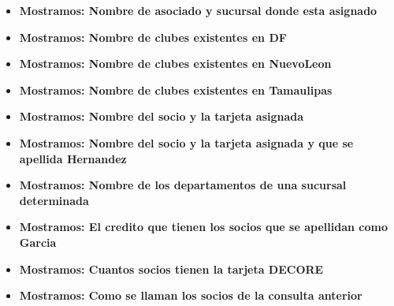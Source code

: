 \documentclass[12pt, fleqn]{article}                             %
\begin{document}
    \begin{itemize}

        \item
            \textbf{Mostramos: Nombre de asociado y sucursal donde esta asignado}
            

        \item
            \textbf{Mostramos: Nombre de clubes existentes en DF}
            

        \item
            \textbf{Mostramos: Nombre de clubes existentes en NuevoLeon}
            

        \item
            \textbf{Mostramos: Nombre de clubes existentes en Tamaulipas}
            

        \item
            \textbf{Mostramos: Nombre del socio y la tarjeta asignada}
            


        \item
            \textbf{Mostramos: Nombre del socio y la tarjeta asignada y que se apellida Hernandez}
            

        \item
            \textbf{Mostramos: Nombre de los departamentos de una sucursal determinada}
            

        \item
            \textbf{Mostramos: El credito que tienen los socios que se apellidan como Garcia}
            

        \item
            \textbf{Mostramos: Cuantos socios tienen la tarjeta DECORE}
            

        \item
            \textbf{Mostramos: Como se llaman los socios de la consulta anterior}
            


\end{itemize}
\end{document}
